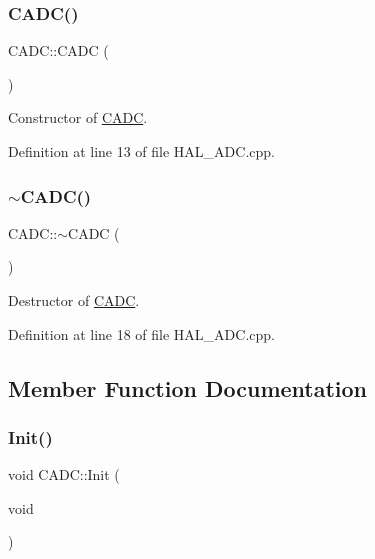 \subsubsection{\texorpdfstring{CADC()}{CADC()}}
{\footnotesize\ttfamily C\+A\+D\+C\+::\+C\+A\+DC (\begin{DoxyParamCaption}{ }\end{DoxyParamCaption})}



Constructor of \mbox{\hyperlink{class_c_a_d_c}{C\+A\+DC}}. 



Definition at line 13 of file H\+A\+L\+\_\+\+A\+D\+C.\+cpp.

\mbox{\label{class_c_a_d_c_ab8a5414ebb4c3707ac1575d63635efd8}} 
\subsubsection{\texorpdfstring{$\sim$CADC()}{~CADC()}}
{\footnotesize\ttfamily C\+A\+D\+C\+::$\sim$\+C\+A\+DC (\begin{DoxyParamCaption}{ }\end{DoxyParamCaption})}



Destructor of \mbox{\hyperlink{class_c_a_d_c}{C\+A\+DC}}. 



Definition at line 18 of file H\+A\+L\+\_\+\+A\+D\+C.\+cpp.



\subsection{Member Function Documentation}
\mbox{\label{class_c_a_d_c_a09118c55821cd6f0c9b2e2d2edd40d33}} 
\subsubsection{\texorpdfstring{Init()}{Init()}}
{\footnotesize\ttfamily void C\+A\+D\+C\+::\+Init (\begin{DoxyParamCaption}\item[{void}]{ }\end{DoxyParamCaption})}



